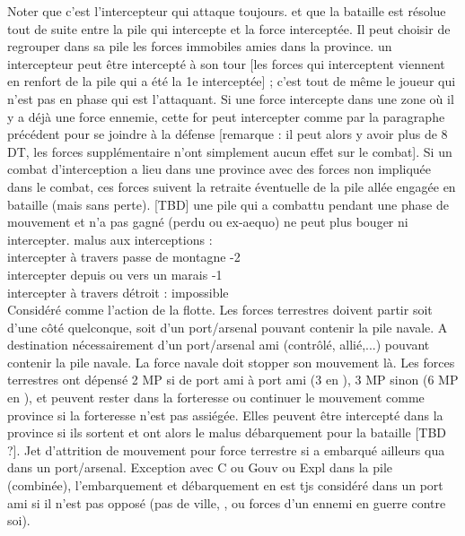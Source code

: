 \bparag Noter que c'est l'intercepteur qui attaque toujours.
et que la bataille est résolue tout de suite entre la pile qui intercepte et la force interceptée.
Il peut choisir de regrouper dans sa pile les forces immobiles amies dans la province.
\bparag un intercepteur peut être intercepté à son tour [les forces qui
interceptent viennent en renfort de la pile qui a été la 1e interceptée] ;
c'est tout de même le joueur qui n'est pas en phase qui est l'attaquant.
\bparag Si une force intercepte dans une zone où il y a déjà une force ennemie,
cette for peut intercepter comme par la paragraphe précédent pour se joindre à
la défense [remarque : il peut alors y avoir plus de 8 DT, les forces supplémentaire
n'ont simplement aucun effet sur le combat].
\bparag  Si un combat d'interception a lieu dans une province avec des forces non impliquée
dans le combat, ces forces suivent la retraite éventuelle de la pile allée engagée en
bataille (mais sans perte). [TBD]
\bparag une pile qui a combattu pendant une phase de mouvement et n'a
pas gagné (perdu ou ex-aequo) ne peut plus bouger ni intercepter.
\bparag malus aux interceptions : \\
	intercepter à travers passe de montagne -2 \\
	intercepter depuis ou vers un marais -1 \\
	intercepter à travers détroit : impossible \\


\bparag Considéré comme l'action de la flotte.
\bparag Les forces terrestres doivent partir soit d'une côté quelconque,
soit d'un port/arsenal pouvant contenir la pile navale. A destination
nécessairement d'un port/arsenal ami (contrôlé, allié,...) pouvant
contenir la pile navale. La force navale doit stopper son mouvement là.
\bparag Les forces terrestres ont dépensé 2 MP si de port ami à port ami
(3 en \ROTW), 3 MP sinon (6 MP en \ROTW), et peuvent rester dans la
forteresse  ou continuer le mouvement comme province si la forteresse n'est pas assiégée.
Elles peuvent être intercepté dans la province si ils sortent et ont alors le
malus débarquement pour la bataille [TBD ?].
\bparag Jet d'attrition de mouvement pour force terrestre si a embarqué
ailleurs qua dans un port/arsenal.
\bparag Exception avec C ou Gouv ou Expl dans la pile (combinée),
l'embarquement et débarquement en \ROTW est tjs considéré dans un port
ami si il n'est pas opposé (pas de ville, \COL, \TP ou forces d'un
ennemi en guerre contre soi).

